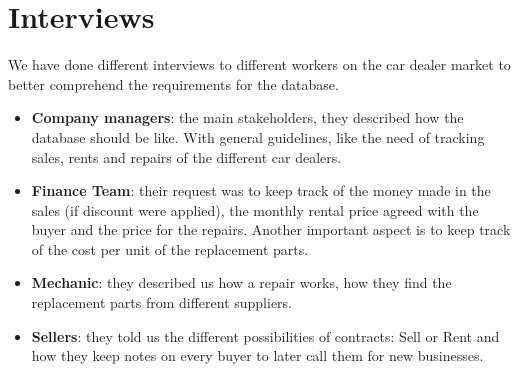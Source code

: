 \section{Interviews}

We have done different interviews to different workers on the car dealer market to better comprehend the requirements for the database.
 \begin{itemize}
	 \item \textbf{Company managers}: the main stakeholders, they described how the database should be like. With general guidelines,
	  like the need of tracking sales, rents and repairs of the different car dealers.
	  \item \textbf{Finance Team}: their request was to keep track of the money made in the sales (if discount were applied), 
	  the monthly rental price agreed with the buyer and the price for the repairs. Another important aspect is to keep track 
	  of the cost per unit of the replacement parts.
	  \item \textbf{Mechanic}: they described us how a repair works, how they find the replacement parts from different suppliers.
	  \item \textbf{Sellers}: they told us the different possibilities of contracts: Sell or Rent and how 
	  they keep notes on every buyer to later call them for new businesses.

 \end{itemize}
